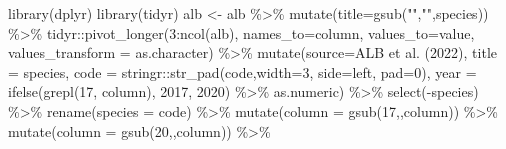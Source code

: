 \documentclass[
]{book}
\newenvironment{Shaded}{\begin{snugshade}}{\end{snugshade}}
\newcommand{\AttributeTok}[1]{\textcolor[rgb]{0.77,0.63,0.00}{#1}}
\newcommand{\DecValTok}[1]{\textcolor[rgb]{0.00,0.00,0.81}{#1}}
\newcommand{\FunctionTok}[1]{\textcolor[rgb]{0.00,0.00,0.00}{#1}}
\newcommand{\NormalTok}[1]{#1}
\newcommand{\OtherTok}[1]{\textcolor[rgb]{0.56,0.35,0.01}{#1}}
\newcommand{\SpecialCharTok}[1]{\textcolor[rgb]{0.00,0.00,0.00}{#1}}
\newcommand{\StringTok}[1]{\textcolor[rgb]{0.31,0.60,0.02}{#1}}
\begin{document}
\begin{Shaded}
\begin{Highlighting}[]
\FunctionTok{library}\NormalTok{(dplyr)}
\FunctionTok{library}\NormalTok{(tidyr)}
\NormalTok{alb }\OtherTok{\textless{}{-}}
\NormalTok{    alb }\SpecialCharTok{\%\textgreater{}\%}
    \FunctionTok{mutate}\NormalTok{(}\AttributeTok{title=}\FunctionTok{gsub}\NormalTok{(}\StringTok{"\textquotesingle{}"}\NormalTok{,}\StringTok{""}\NormalTok{,species)) }\SpecialCharTok{\%\textgreater{}\%}
\NormalTok{    tidyr}\SpecialCharTok{::}\FunctionTok{pivot\_longer}\NormalTok{(}\DecValTok{3}\SpecialCharTok{:}\FunctionTok{ncol}\NormalTok{(alb),}
                        \AttributeTok{names\_to=}\StringTok{\textquotesingle{}column\textquotesingle{}}\NormalTok{,}
                        \AttributeTok{values\_to=}\StringTok{\textquotesingle{}value\textquotesingle{}}\NormalTok{,}
                        \AttributeTok{values\_transform =}\NormalTok{ as.character) }\SpecialCharTok{\%\textgreater{}\%}
    \FunctionTok{mutate}\NormalTok{(}\AttributeTok{source=}\StringTok{\textquotesingle{}ALB et al. (2022)\textquotesingle{}}\NormalTok{,}
           \AttributeTok{title =}\NormalTok{ species,}
           \AttributeTok{code =}\NormalTok{ stringr}\SpecialCharTok{::}\FunctionTok{str\_pad}\NormalTok{(code,}\AttributeTok{width=}\DecValTok{3}\NormalTok{, }\AttributeTok{side=}\StringTok{\textquotesingle{}left\textquotesingle{}}\NormalTok{, }\AttributeTok{pad=}\StringTok{\textquotesingle{}0\textquotesingle{}}\NormalTok{),}
           \AttributeTok{year =} \FunctionTok{ifelse}\NormalTok{(}\FunctionTok{grepl}\NormalTok{(}\StringTok{\textquotesingle{}17\textquotesingle{}}\NormalTok{, column), }\DecValTok{2017}\NormalTok{, }\DecValTok{2020}\NormalTok{) }\SpecialCharTok{\%\textgreater{}\%}\NormalTok{ as.numeric) }\SpecialCharTok{\%\textgreater{}\%}
    \FunctionTok{select}\NormalTok{(}\SpecialCharTok{{-}}\NormalTok{species) }\SpecialCharTok{\%\textgreater{}\%}
    \FunctionTok{rename}\NormalTok{(}\AttributeTok{species =}\NormalTok{ code) }\SpecialCharTok{\%\textgreater{}\%}
    \FunctionTok{mutate}\NormalTok{(}\AttributeTok{column =} \FunctionTok{gsub}\NormalTok{(}\StringTok{\textquotesingle{}17\textquotesingle{}}\NormalTok{,}\StringTok{\textquotesingle{}\textquotesingle{}}\NormalTok{,column)) }\SpecialCharTok{\%\textgreater{}\%}
    \FunctionTok{mutate}\NormalTok{(}\AttributeTok{column =} \FunctionTok{gsub}\NormalTok{(}\StringTok{\textquotesingle{}20\textquotesingle{}}\NormalTok{,}\StringTok{\textquotesingle{}\textquotesingle{}}\NormalTok{,column)) }\SpecialCharTok{\%\textgreater{}\%}

\end{Highlighting}
\end{Shaded}
\end{document}
